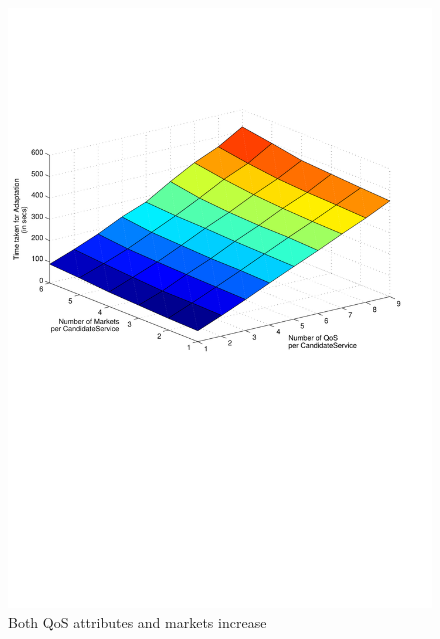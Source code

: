 \documentclass[10pt,journal,compsoc]{IEEEtran}
\begin{document}
\begin{figure}[htbp]
	\centering
	\includegraphics[clip, trim=2cm 12cm 2cm 6cm, scale=0.45]{graphs/scaling_time_qos_mkts.pdf}
	\caption{Both QoS attributes and markets increase \label{fig:qos_and_mkts_scaling}}
\end{figure}
\end{document}
